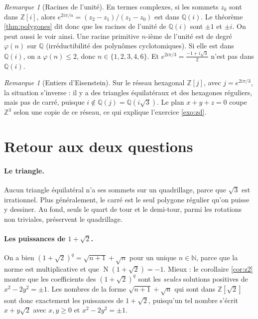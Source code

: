 \documentclass[11pt,a4paper]{article}
\theoremstyle{plain}
\theoremstyle{definition}
\theoremstyle{remark}
\newtheorem{remarque}[theoreme]{Remarque}
\newcommand{\N}{\mathbb{N}}
\newcommand{\Z}{\mathbb{Z}}
\newcommand{\Q}{\mathbb{Q}}
\DeclareMathOperator{\Nm}{N}
\begin{document}
\begin{remarque}[Racines de l'unité]
En termes complexes, si les sommets $z_k$ sont dans $\Z[i]$, alors $e^{2i\pi/n}=(z_2-z_1)/(z_1-z_0)$ est dans $\Q(i)$. Le théorème \ref{thm:polygones} dit donc que les racines de l'unité de $\Q(i)$ sont $\pm1$ et $\pm i$. On peut aussi le voir ainsi. Une racine primitive $n$-ième de l'unité est de degré $\varphi(n)$ sur $\Q$ (irréductibilité des polynômes cyclotomiques). Si elle est dans $\Q(i)$, on a $\varphi(n)\leq2$, donc $n\in\{1,2,3,4,6\}$. Et $e^{2i\pi/3}=\frac{-1+i\sqrt3}2$ n'est pas dans $\Q(i)$.
\end{remarque}

\begin{remarque}[Entiers d'Eisenstein]
Sur le réseau hexagonal $\Z[j]$, avec $j=e^{2i\pi/3}$, la situation s'inverse : il y a des triangles équilatéraux et des hexagones réguliers, mais pas de carré, puisque $i\notin\Q(j)=\Q(i\sqrt3)$. Le plan $x+y+z=0$ coupe $\Z^3$ selon une copie de ce réseau, ce qui explique l'exercice \ref{exo:zd}.
\end{remarque}

\section{Retour aux deux questions}

\paragraph{Le triangle.} Aucun triangle équilatéral n'a ses sommets sur un quadrillage, parce que $\sqrt3$ est irrationnel. Plus généralement, le carré est le seul polygone régulier qu'on puisse y dessiner. Au fond, seuls le quart de tour et le demi-tour, parmi les rotations non triviales, préservent le quadrillage.

\paragraph{Les puissances de $1+\sqrt2$.} On a bien $(1+\sqrt2)^q=\sqrt{n+1}+\sqrt n$ pour un unique $n\in\N$, parce que la norme est multiplicative et que $\Nm(1+\sqrt2)=-1$. Mieux : le corollaire \ref{cor:z2} montre que les coefficients des $(1+\sqrt2)^q$ sont les \emph{seules} solutions positives de $x^2-2y^2=\pm1$. Les nombres de la forme $\sqrt{n+1}+\sqrt n$ qui sont dans $\Z[\sqrt2]$ sont donc exactement les puissances de $1+\sqrt2$, puisqu'un tel nombre s'écrit $x+y\sqrt2$ avec $x,y\geq0$ et $x^2-2y^2=\pm1$.
\end{document}
